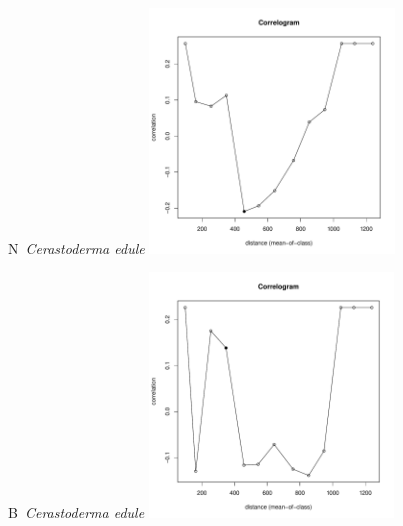 \documentclass[12pt, a4paper]{disser}
\begin{document}
\begin{figure}[h]
	
	\begin{minipage}[b]{.46\linewidth}
	\begin{center}
	{\small N~{\it Cerastoderma edule}}
		\includegraphics[width=65mm]{../Barenc_Sea/distribution_Moran/Pala_moran_N_Cerastoderma_edule_.pdf}
	\end{center}
	\end{minipage}
	\hfil %
	\begin{minipage}[b]{.46\linewidth}
	\begin{center}
	{\small B~{\it Cerastoderma edule}}
		\includegraphics[width=65mm]{../Barenc_Sea/distribution_Moran/Pala_moran_B_Cerastoderma_edule_.pdf}
	\end{center}
	\end{minipage}






\end{figure}
\end{document}
